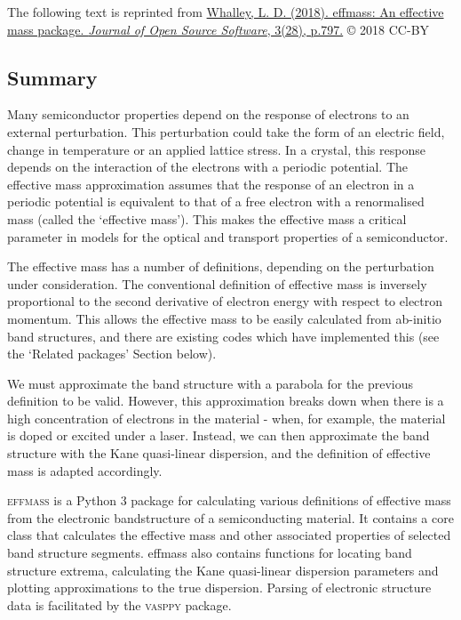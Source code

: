 
The following text is reprinted from \href{https://doi.org/10.21105/joss.00797}{Whalley, L. D. (2018). effmass: An effective mass package. \textit{Journal of Open Source Software}, 3(28), p.797.} © 2018 CC-BY 

\subsection*{Summary}
\label{sec:summary}

Many semiconductor properties depend on the response of electrons to an external perturbation. This perturbation could take the form of an electric field, change in temperature or an applied lattice stress. In a crystal, this response depends on the interaction of the electrons with a periodic potential. The effective mass approximation assumes that the response of an electron in a periodic potential is equivalent to that of a free electron with a renormalised mass (called the `effective mass'). This makes the effective mass a critical parameter in models for the optical and transport properties of a semiconductor.

The effective mass has a number of definitions, depending on the perturbation under consideration. The conventional definition of effective mass is inversely proportional to the second derivative of electron energy with respect to electron momentum.\autocite[p.~227]{Ashcroft1976} This allows the effective mass to be easily calculated from ab-initio band structures, and there are existing codes which have implemented this (see the `Related packages' Section below).

We must approximate the band structure with a parabola for the previous definition to be valid.\autocite{Ariel2012} However, this approximation breaks down when there is a high concentration of electrons in the material - when, for example, the material is doped or excited under a laser. Instead, we can then approximate the band structure with the Kane quasi-linear dispersion,\autocite{Kane1957} and the definition of effective mass is adapted accordingly.

\textsc{effmass} is a Python 3 package for calculating various definitions of effective mass from the electronic bandstructure of a semiconducting material. It contains a core class that calculates the effective mass and other associated properties of selected band structure segments. effmass also contains functions for locating band structure extrema, calculating the Kane quasi-linear dispersion parameters and plotting approximations to the true dispersion. Parsing of electronic structure data is facilitated by the \textsc{vasppy} package.\autocite{Morgan2018}


